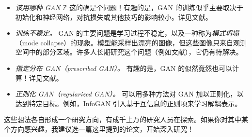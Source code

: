 \begin{itemize}
\begin{equation}
    \mathbb E_{\mathbf x\sim p_{\mathit{data}}(\mathbf x)}[E(\mathbf x)]
    -\mathbb E_{\mathbf x\sim q(\mathbf x)}[E(\mathbf x)]+\mathbb H[q(\mathbf x)],
    \tag{8.11}\label{eq:08-11}
  \end{equation}
  其中 $E(\cdot)$ 是能量函数，$\mathbb H[\cdot]$ 是熵。问题再次归结为极小极大优化，也就是对能量函数求极小，对变分分布求极大。在这里，对抗损失与变分下界之间的第二个区别是熵项，它通常难以计算。
  \item \emph{该用哪种 GAN？} 这的确是个问题！有趣的是，GAN 的训练似乎主要取决于初始化和神经网络，对抗损失或其他技巧的影响较小。详见文献。
  \item \emph{训练不稳定。} GAN 的主要问题是学习过程不稳定，以及一种称为\emph{模式坍塌}（mode collapse）的现象。模型能采样出漂亮的图像，但这些图像只来自观测空间中的部分区域。许多人长期研究这个问题（例如文献），它仍有待解决。
  \item \emph{指定分布 GAN（prescribed GAN）。} 有趣的是，GAN 的似然竟然也可以计算！详见文献。
  \item \emph{正则化 GAN（regularized GAN）。} 可以用多种方法对 GAN 加以正则化，以达到特定目标。例如，InfoGAN 引入基于互信息的正则项来学习解耦表示。
\end{itemize}

这些想法各自形成一个研究方向，有成千上万的研究人员在探索。如果你对其中某个方向感兴趣，我建议选一篇这里提到的论文，开始深入研究！

\FloatBarrier

